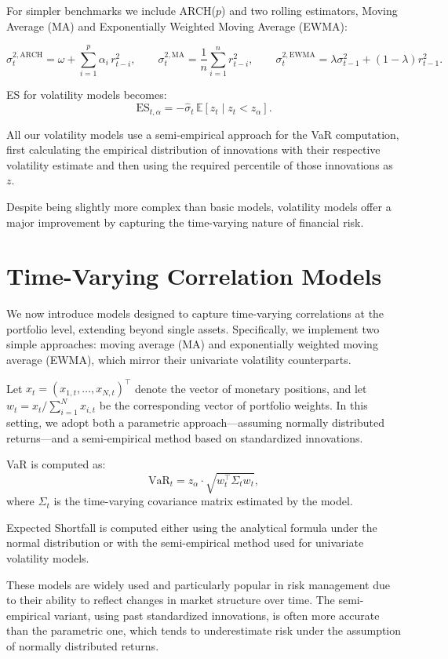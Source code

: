 \documentclass[12pt]{article}
\begin{document}
For simpler benchmarks we include ARCH(\( p \)) and two rolling estimators, Moving Average (MA) and Exponentially Weighted Moving Average (EWMA):

\[
\sigma_{t}^{2,\mathrm{ARCH}}=\omega+\sum_{i=1}^{p} \alpha_{i}\, r_{t-i}^{2},\qquad
\sigma_{t}^{2,\mathrm{MA}}=\frac{1}{n}\sum_{i=1}^{n} r_{t-i}^{2},\qquad
\sigma_{t}^{2,\mathrm{EWMA}}=\lambda \sigma_{t-1}^{2}+(1-\lambda) r_{t-1}^{2}.
\]

ES for volatility models becomes:
\[
  \text{ES}_{t,\alpha} = -\hat{\sigma}_t \, \mathbb{E}[z_t \mid z_t < z_\alpha].
\] 

All our volatility models use a semi-empirical approach for the VaR computation, first calculating the empirical distribution of innovations with their respective volatility estimate and then using the required percentile of those innovations as \( z \).

Despite being slightly more complex than basic models, volatility models offer a major improvement by capturing the time-varying nature of financial risk.


\section{Time-Varying Correlation Models}

We now introduce models designed to capture time-varying correlations at the portfolio level, extending beyond single assets. Specifically, we implement two simple approaches: moving average (MA) and exponentially weighted moving average (EWMA), which mirror their univariate volatility counterparts.

Let \( x_t = (x_{1,t}, \dots, x_{N,t})^\top \) denote the vector of monetary positions, and let \( w_t = x_t / \sum_{i=1}^N x_{i,t} \) be the corresponding vector of portfolio weights. In this setting, we adopt both a parametric approach—assuming normally distributed returns—and a semi-empirical method based on standardized innovations.

VaR is computed as:
\[
\text{VaR}_t = z_\alpha \cdot \sqrt{w_t^\top \Sigma_t w_t},
\]
where \( \Sigma_t \) is the time-varying covariance matrix estimated by the model.

Expected Shortfall is computed either using the analytical formula under the normal distribution or with the semi-empirical method used for univariate volatility models.

These models are widely used and particularly popular in risk management due to their ability to reflect changes in market structure over time. The semi-empirical variant, using past standardized innovations, is often more accurate than the parametric one, which tends to underestimate risk under the assumption of normally distributed returns.
\end{document}
